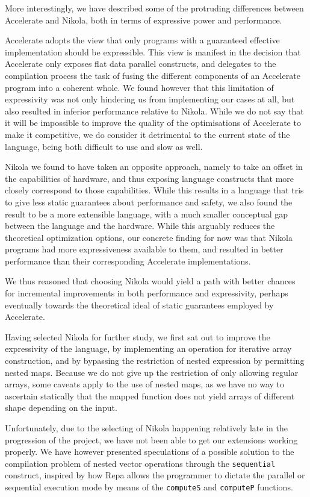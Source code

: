 More interestingly, we have described some of the protruding differences
between Accelerate and Nikola, both in terms of expressive power and
performance.

Accelerate adopts the view that only programs with a guaranteed effective
implementation should be expressible. This view is manifest in the decision
that Accelerate only exposes flat data parallel constructs, and delegates to
the compilation process the task of fusing the different components of an
Accelerate program into a coherent whole.  We found however that this
limitation of expressivity was not only hindering us from implementing our
cases at all, but also resulted in inferior performance relative to Nikola.
While we do not say that it will be impossible to improve the quality of the
optimisations of Accelerate to make it competitive, we do consider it
detrimental to the current state of the language, being both difficult to use
and slow as well.

Nikola we found to have taken an opposite approach, namely to take an offset in
the capabilities of hardware, and thus exposing language constructs that more
closely correspond to those capabilities.  While this results in a language
that tris to give less static guarantees about performance and safety, we also
found the result to be a more extensible language, with a much smaller
conceptual gap between the language and the hardware. While this arguably
reduces the theoretical optimization options, our concrete finding for now was
that Nikola programs had more expressiveness available to them, and resulted in
better performance than their corresponding Accelerate implementations.

We thus reasoned that choosing Nikola would yield a path with better chances
for incremental improvements in both performance and expressivity, perhaps
eventually towards the theoretical ideal of static guarantees employed by
Accelerate.

Having selected Nikola for further study, we first sat out to improve the
expressivity of the language, by implementing an operation for iterative array
construction, and by bypassing the restriction of nested expression by
permitting nested maps. Because we do not give up the restriction of only
allowing regular arrays, some caveats apply to the use of nested maps, as we
have no way to ascertain statically that the mapped function does not yield
arrays of different shape depending on the input.

Unfortunately, due to the selecting of Nikola happening relatively late in the
progression of the project, we have not been able to get our extensions working
properly. We have however presented speculations of a possible solution to the
compilation problem of nested vector operations through the
\lstinline{sequential} construct, inspired by how Repa allows the programmer to
dictate the parallel or sequential execution mode by means of the
\lstinline{computeS} and \lstinline{computeP} functions.

